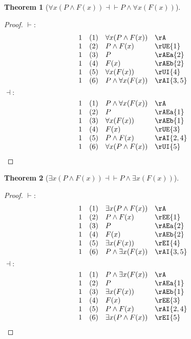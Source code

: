 \documentclass{book}
\theoremstyle{plain}
\newtheorem{theorem}{Theorem}
\theoremstyle{remark}
\theoremstyle{definition}
\begin{document}
\label{FaxLpPAndFLpxRpRpEqvPAndFaxLpFLpxRpRp}
\begin{theorem}[\(\forall x(P \land F(x)) \dashv \vdash P \land \forall x(F(x))\)]
\end{theorem}
\begin{proof}
	\(\vdash:\)
	\[
	\begin{array}{llll}
		1 & (1) & \forall x(P \land F(x)) & \rA \\
		1 & (2) & P \land F(x) & \rUE{1} \\
		1 & (3) & P & \rAEa{2} \\
		1 & (4) & F(x) & \rAEb{2} \\
		1 & (5) & \forall x(F(x)) & \rUI{4} \\
		1 & (6) & P \land \forall x(F(x)) & \rAI{3,5} \\
	\end{array}
	\]
	\(\dashv:\)
	\[
	\begin{array}{llll}
		1 & (1) & P \land \forall x(F(x)) & \rA \\
		1 & (2) & P & \rAEa{1} \\
		1 & (3) & \forall x(F(x)) & \rAEb{1} \\
		1 & (4) & F(x) & \rUE{3} \\
		1 & (5) & P \land F(x) & \rAI{2,4} \\
		1 & (6) & \forall x(P \land F(x)) & \rUI{5} \\
	\end{array}
	\]
\end{proof}

\label{ExxLpPAndFLpxRpRpEqvPAndExxLpFLpxRpRp}
\begin{theorem}[\(\exists x(P \land F(x)) \dashv \vdash P \land \exists x(F(x))\)]
\end{theorem}
\begin{proof}
	\(\vdash:\)
	\[
	\begin{array}{llll}
		1 & (1) & \exists x(P \land F(x)) & \rA \\
		1 & (2) & P \land F(x) & \rEE{1} \\
		1 & (3) & P & \rAEa{2} \\
		1 & (4) & F(x) & \rAEb{2} \\
		1 & (5) & \exists x(F(x)) & \rEI{4} \\
		1 & (6) & P \land \exists x(F(x)) & \rAI{3,5} \\
	\end{array}
	\]
	\(\dashv:\)
	\[
	\begin{array}{llll}
		1 & (1) & P \land \exists x(F(x)) & \rA \\
		1 & (2) & P & \rAEa{1} \\
		1 & (3) & \exists x(F(x)) & \rAEb{1} \\
		1 & (4) & F(x) & \rEE{3} \\
		1 & (5) & P \land F(x) & \rAI{2,4} \\
		1 & (6) & \exists x(P \land F(x)) & \rEI{5} \\
	\end{array}
	\]
\end{proof}
\end{document}

